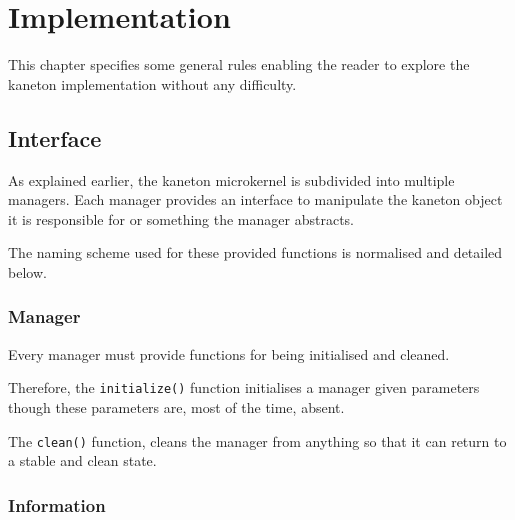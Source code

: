 %
%
%
%
%
%

%
%

\chapter{Implementation}
\label{chapter:implementation}

This chapter specifies some general rules enabling the reader to explore
the kaneton implementation without any difficulty.

\newpage

%
%

%
%

\section{Interface}

As explained earlier, the kaneton microkernel is subdivided into multiple
managers. Each manager provides an interface to manipulate the kaneton object
it is responsible for or something the manager abstracts.

The naming scheme used for these provided functions is normalised and
detailed below.


\subsection*{Manager}

Every manager must provide functions for being initialised and cleaned.

Therefore, the \texttt{initialize()} function initialises a manager given
parameters though these parameters are, most of the time, absent.

The \texttt{clean()} function, cleans the manager from anything so that it
can return to a stable and clean state.


\subsection*{Information}

